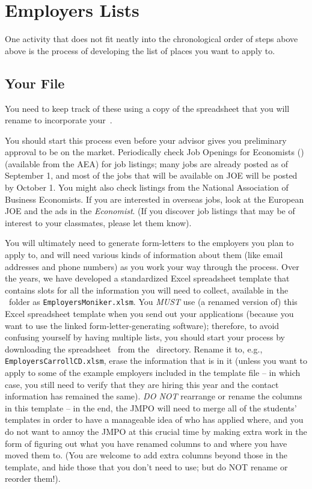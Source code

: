 \documentclass{\classes/econtex}
\begin{document}
\section*{Employers Lists}\hypertarget{employers-lists}{}

One activity that does not fit neatly into the chronological order of steps above above is the process of developing the list of places you want to apply to.

\hypertarget{your-emw-file}{}
\subsection*{Your \EMW File}
You need to keep track of these using a copy of the {\Employers} spreadsheet that you will rename to incorporate your{~\Moniker}.

You should start this process even before your advisor gives you preliminary approval to be on the market.  Periodically check Job Openings for Economists (\JOE) (available from the AEA) for job listings; many jobs are already posted as of September 1, and most of the jobs that will be available on JOE will be posted by October 1.  You might also check listings from the National Association of Business Economists.  If you are interested in overseas jobs, look at the European JOE and the ads in the \textit{Economist}.  (If you discover job listings that may be of interest to your classmates, please let them know).

You will ultimately need to generate form-letters to the employers you plan to apply to, and will need various kinds of information about them (like email addresses and phone numbers) as you work your way through the process.  Over the years, we have developed a standardized Excel spreadsheet template that contains slots for all the information you will need to collect, available in the \Templates~folder as \texttt{EmployersMoniker.xlsm}.  You \textit{MUST} use (a renamed version of) this Excel spreadsheet template when you send out your applications (because you want to use the linked form-letter-generating software); therefore, to avoid confusing yourself by having multiple lists, you should start your process by downloading the spreadsheet {\Employers}~from the \Templates~directory.  Rename it to, e.g., \texttt{EmployersCarrollCD.xlsm}, erase the information that is in it (unless you want to apply to some of the example employers included in the template file -- in which case, you still need to verify that they are hiring this year and the contact information has remained the same).  \textit{DO NOT} rearrange or rename the columns in this template -- in the end, the JMPO will need to merge all of the students' templates in order to have a manageable idea of who has applied where, and you do not want to annoy the JMPO at this crucial time by making extra work in the form of figuring out what you have renamed columns to and where you have moved them to.  (You are welcome to add extra columns beyond those in the template, and hide those that you don't need to use; but do NOT rename or reorder them!).
\end{document}
